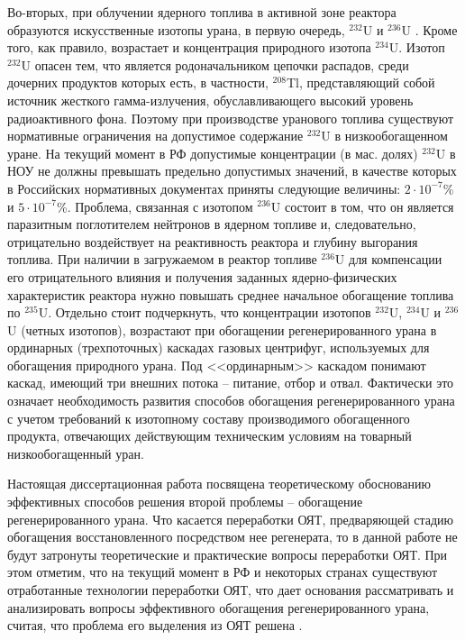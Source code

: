 Во-вторых, при облучении ядерного топлива в активной зоне реактора образуются искусственные изотопы урана, в первую очередь, $^{232}$U и $^{236}$U . Кроме того, как правило, возрастает и концентрация природного изотопа $^{234}$U. Изотоп $^{232}$U опасен тем, что является родоначальником цепочки распадов, среди дочерних продуктов которых есть,  в частности, $^{208}$Tl, представляющий собой источник жесткого гамма-излучения, обуславливающего высокий уровень радиоактивного фона. Поэтому при производстве уранового топлива существуют нормативные ограничения на допустимое содержание $^{232}$U в низкообогащенном уране. На текущий момент в РФ допустимые концентрации (в мас. долях) $^{232}$U в НОУ не должны превышать предельно допустимых значений, в качестве которых в Российских нормативных документах приняты следующие величины: $2\cdot10^{-7}$\% и $5\cdot10^{-7}$\%. Проблема, связанная с изотопом $^{236}$U состоит в том, что он является паразитным поглотителем нейтронов в ядерном топливе и, следовательно, отрицательно воздействует на реактивность реактора и глубину выгорания топлива. При наличии в загружаемом в реактор топливе $^{236}$U для компенсации его отрицательного влияния и получения заданных ядерно-физических характеристик реактора нужно повышать среднее начальное обогащение топлива по $^{235}$U.  Отдельно стоит подчеркнуть, что концентрации изотопов $^{232}$U, $^{234}$U и $^{236}$U (четных изотопов), возрастают при обогащении регенерированного урана в ординарных (трехпоточных) каскадах газовых центрифуг, используемых для обогащения природного урана. Под <<ординарным>> каскадом понимают каскад, имеющий три внешних потока -- питание, отбор и отвал. Фактически это означает необходимость развития способов обогащения регенерированного урана с учетом требований к изотопному составу производимого обогащенного продукта, отвечающих действующим техническим условиям на товарный низкообогащенный уран.

Настоящая диссертационная работа посвящена теоретическому обоснованию эффективных способов решения второй проблемы -- обогащение регенерированного урана. Что касается переработки ОЯТ, предваряющей стадию обогащения восстановленного посредством нее регенерата, то в данной работе не будут затронуты теоретические и практические вопросы переработки ОЯТ. При этом отметим, что на текущий момент в РФ и некоторых странах существуют отработанные технологии переработки ОЯТ, что дает основания рассматривать и анализировать вопросы эффективного обогащения регенерированного урана, считая, что проблема его выделения из ОЯТ решена \cite{KoncepciyaPoObrashcheniyu,gaoEconomicPotentialFuel2017,moratillasoriaRecyclingLongTermStorage2013,bouchardECONOMICSNUCLEARENERGY}.

